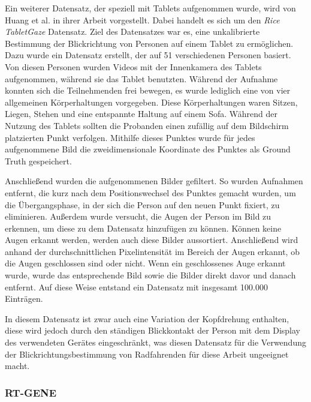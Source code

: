 Ein weiterer Datensatz, der speziell mit Tablets aufgenommen wurde, wird von Huang et al. in ihrer Arbeit \cite{paper:tabletgaze} vorgestellt. Dabei handelt es sich um den \textit{Rice TabletGaze} Datensatz. Ziel des Datensatzes war es, eine unkalibrierte Bestimmung der Blickrichtung von Personen auf einem Tablet zu ermöglichen. Dazu wurde ein Datensatz erstellt, der auf 51 verschiedenen Personen basiert. Von diesen Personen wurden Videos mit der Innenkamera des Tablets aufgenommen, während sie das Tablet benutzten. Während der Aufnahme konnten sich die Teilnehmenden frei bewegen, es wurde lediglich eine von vier allgemeinen Körperhaltungen vorgegeben. Diese Körperhaltungen waren Sitzen, Liegen, Stehen und eine entspannte Haltung auf einem Sofa. Während der Nutzung des Tablets sollten die Probanden einen zufällig auf dem Bildschirm platzierten Punkt verfolgen. Mithilfe dieses Punktes wurde für jedes aufgenommene Bild die zweidimensionale Koordinate des Punktes als Ground Truth gespeichert.

Anschließend wurden die aufgenommenen Bilder gefiltert. So wurden Aufnahmen entfernt, die kurz nach dem Positionswechsel des Punktes gemacht wurden, um die Übergangsphase, in der sich die Person auf den neuen Punkt fixiert, zu eliminieren. Außerdem wurde versucht, die Augen der Person im Bild zu erkennen, um diese zu dem Datensatz hinzufügen zu können. Können keine Augen erkannt werden, werden auch diese Bilder aussortiert. Anschließend wird anhand der durchschnittlichen Pixelintensität im Bereich der Augen erkannt, ob die Augen geschlossen sind oder nicht. Wenn ein geschlossenes Auge erkannt wurde, wurde das entsprechende Bild sowie die Bilder direkt davor und danach entfernt. Auf diese Weise entstand ein Datensatz mit insgesamt 100.000 Einträgen.

In diesem Datensatz ist zwar auch eine Variation der Kopfdrehung enthalten, diese wird jedoch durch den ständigen Blickkontakt der Person mit dem Display des verwendeten Gerätes eingeschränkt, was diesen Datensatz für die Verwendung der Blickrichtungsbestimmung von Radfahrenden für diese Arbeit ungeeignet macht.

\subsubsection{RT-GENE}\label{sec:related:gaze:appearance:rt-gene}

